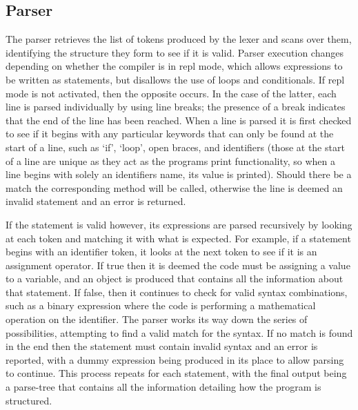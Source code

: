 \documentclass[
]{report}
\begin{document}
\subsection{Parser}
The parser retrieves the list of \glspl{token} produced by the lexer and scans
over them, identifying the structure they form to see if it is valid.
Parser execution changes depending on whether the compiler is in \acrshort{repl}
mode, which allows \glspl{expression} to be written as \glspl{statement}, but disallows
the use of loops and conditionals. If \acrshort{repl} mode is not activated, then
the opposite occurs. In the case of the latter, each line is parsed
individually by using line breaks; the presence of a break indicates
that the end of the line has been reached. When a line is parsed it is
first checked to see if it begins with any particular \glspl{keyword} that can
only be found at the start of a line, such as `if', `loop', open braces,
and \glspl{identifier} (those at the start of a line are unique as they act as
the programs print functionality, so when a line begins with solely an
\glspl{identifier} name, its value is printed). Should there be a match the
corresponding method will be called, otherwise the line is deemed an
invalid \gls{statement} and an error is returned.

If the \gls{statement} is valid however, its \glspl{expression} are parsed
recursively by looking at each \gls{token} and matching it with what is
expected. For example, if a \gls{statement} begins with an \gls{identifier} \gls{token},
it looks at the next \gls{token} to see if it is an assignment operator. If
true then it is deemed the code must be assigning a value to a variable,
and an object is produced that contains all the information about that
\gls{statement}. If false, then it continues to check for valid syntax
combinations, such as a binary \gls{expression} where the code is performing a
mathematical operation on the \gls{identifier}. The parser works its way down
the series of possibilities, attempting to find a valid match for the
syntax. If no match is found in the end then the \gls{statement} must contain
invalid syntax and an error is reported, with a dummy \gls{expression} being
produced in its place to allow \gls{parsing} to continue. This process repeats
for each \gls{statement}, with the final output being a \gls{parse-tree} that
contains all the information detailing how the program is structured.
\end{document}
